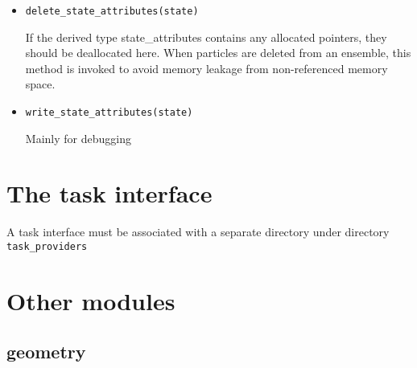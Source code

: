 \begin{itemize}
\item {\tt  delete\_state\_attributes(state)}  

If the derived type state\_attributes contains any allocated
pointers, they should be deallocated here. When particles are
deleted from an ensemble, this method is invoked to avoid
memory leakage from non-referenced memory space.


\item {\tt  write\_state\_attributes(state)} 

Mainly for debugging

\end{itemize}


\section{The task interface}

A task interface
must be associated with a separate directory under directory {\tt task\_providers}

\section{Other modules}
\subsection{geometry}

